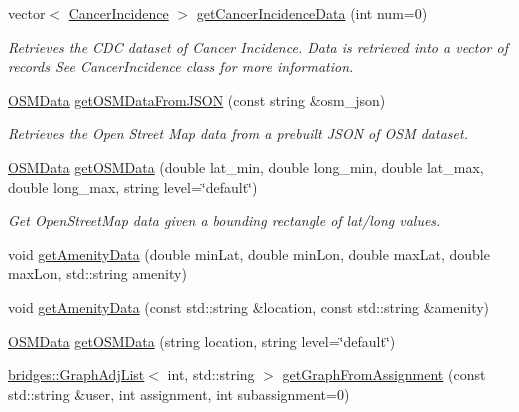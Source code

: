 \begin{DoxyCompactItemize}
vector$<$ \hyperlink{classbridges_1_1dataset_1_1_cancer_incidence}{Cancer\+Incidence} $>$ \hyperlink{classbridges_1_1_data_source_a52d8161e7c093ab3615acea7085f6689}{get\+Cancer\+Incidence\+Data} (int num=0)
\begin{DoxyCompactList}\small\item\em Retrieves the C\+DC dataset of Cancer Incidence. Data is retrieved into a vector of records See Cancer\+Incidence class for more information. \end{DoxyCompactList}\item 
\hyperlink{classbridges_1_1dataset_1_1_o_s_m_data}{O\+S\+M\+Data} \hyperlink{classbridges_1_1_data_source_a1b483de1cce9921b70116213382cdaf0}{get\+O\+S\+M\+Data\+From\+J\+S\+ON} (const string \&osm\+\_\+json)
\begin{DoxyCompactList}\small\item\em Retrieves the Open Street Map data from a prebuilt J\+S\+ON of O\+SM dataset. \end{DoxyCompactList}\item 
\hyperlink{classbridges_1_1dataset_1_1_o_s_m_data}{O\+S\+M\+Data} \hyperlink{classbridges_1_1_data_source_a57736934a90bdb86948a7c338ec81a2d}{get\+O\+S\+M\+Data} (double lat\+\_\+min, double long\+\_\+min, double lat\+\_\+max, double long\+\_\+max, string level=\char`\"{}default\char`\"{})
\begin{DoxyCompactList}\small\item\em Get Open\+Street\+Map data given a bounding rectangle of lat/long values. \end{DoxyCompactList}\item 
void \hyperlink{classbridges_1_1_data_source_acdd904b0aea30e34738aa8d5fa0efba5}{get\+Amenity\+Data} (double min\+Lat, double min\+Lon, double max\+Lat, double max\+Lon, std\+::string amenity)
\item 
void \hyperlink{classbridges_1_1_data_source_acbd6561dccd99a331f137d605f6cf6f7}{get\+Amenity\+Data} (const std\+::string \&location, const std\+::string \&amenity)
\item 
\hyperlink{classbridges_1_1dataset_1_1_o_s_m_data}{O\+S\+M\+Data} \hyperlink{classbridges_1_1_data_source_a3151f5b2a27b5d6b11e1c5cb55d51655}{get\+O\+S\+M\+Data} (string location, string level=\char`\"{}default\char`\"{})
\item 
\hyperlink{classbridges_1_1datastructure_1_1_graph_adj_list}{bridges\+::\+Graph\+Adj\+List}$<$ int, std\+::string $>$ \hyperlink{classbridges_1_1_data_source_ac4edf55c163c60f17b13f5499e5d2e65}{get\+Graph\+From\+Assignment} (const std\+::string \&user, int assignment, int subassignment=0)

\end{DoxyCompactItemize}
